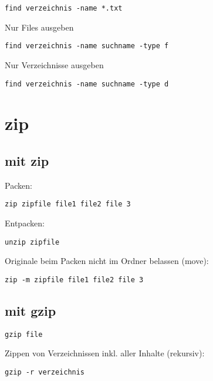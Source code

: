 \documentclass[]{book}
\begin{document}
\begin{verbatim}
find verzeichnis -name *.txt
\end{verbatim}

Nur Files ausgeben

\begin{verbatim}
find verzeichnis -name suchname -type f
\end{verbatim}

Nur Verzeichnisse ausgeben

\begin{verbatim}
find verzeichnis -name suchname -type d
\end{verbatim}

\hypertarget{zip}{%
\section{zip}\label{zip}}

\hypertarget{mit-zip}{%
\subsection{mit zip}\label{mit-zip}}

Packen:

\begin{verbatim}
zip zipfile file1 file2 file 3
\end{verbatim}

Entpacken:

\begin{verbatim}
unzip zipfile
\end{verbatim}

Originale beim Packen nicht im Ordner belassen (move):

\begin{verbatim}
zip -m zipfile file1 file2 file 3
\end{verbatim}

\hypertarget{mit-gzip}{%
\subsection{mit gzip}\label{mit-gzip}}

\begin{verbatim}
gzip file
\end{verbatim}

Zippen von Verzeichnissen inkl. aller Inhalte (rekursiv):

\begin{verbatim}
gzip -r verzeichnis
\end{verbatim}
\end{document}
